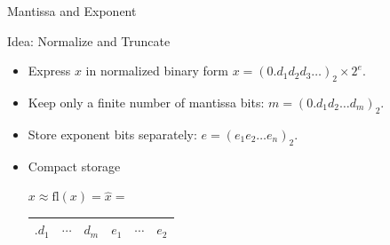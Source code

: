 \documentclass[10pt]{beamer}
\begin{document}

\begin{frame}{Mantissa and Exponent}


{}

\begin{block}{Idea: Normalize and Truncate}
\begin{itemize}
    \item Express $x$ in normalized binary form  
    $ x =  (0.d_1 d_2 d_3 \dots )_2 \times 2^{e}. $
    \item Keep only a finite number of mantissa bits:
    $ m = (0.d_1 d_2 \dots d_m)_2. $
    \item Store exponent bits separately:
    $ e = (e_1 e_2 \dots e_n)_2.$
    \item Compact storage
    \begin{center}$x\approx\mathrm{fl}(x)=\hat{x}=$
    \begin{tabular}{|c|c|c||c|c| c|}\hline
      $.d_1$ & $\cdots$ & $d_m$ & $e_1$ & $\cdots$&$e_2$\\\hline
    \end{tabular}
    \end{center}
\end{itemize}
\end{block}

\end{frame}
\end{document}
